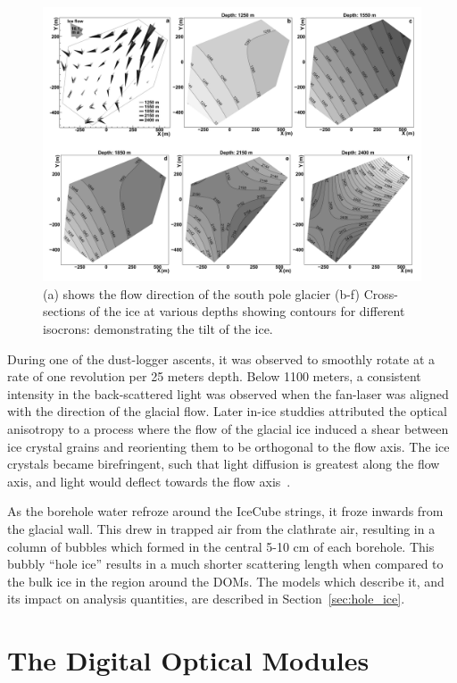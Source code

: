 \documentclass[main.tex]{subfiles}
\begin{document}
\begin{figure}  
    \centering
    \includegraphics[width=0.8\linewidth]{figures/icecube_isochron.png}
    \caption{(a) shows the flow direction of the south pole glacier (b-f) Cross-sections of the ice at various depths showing contours for different isocrons: demonstrating the tilt of the ice.}\label{fig:isochron}
\end{figure}

During one of the dust-logger ascents, it was observed to smoothly rotate at a rate of one revolution per 25 meters depth. 
Below 1100 meters, a consistent intensity in the back-scattered light was observed when the fan-laser was aligned with the direction of the glacial flow. 
Later in-ice studdies attributed the optical anisotropy to a process where the flow of the glacial ice induced a shear between ice crystal grains and reorienting them to be orthogonal to the flow axis. 
The ice crystals became birefringent, such that light diffusion is greatest along the flow axis, and light would deflect towards the flow axis~\cite{ice_anisotropy, ice_birefringence}.

As the borehole water refroze around the IceCube strings, it froze inwards from the glacial wall. 
This drew in trapped air from the clathrate air, resulting in a column of bubbles which formed in the central 5-10 cm of each borehole.
This bubbly ``hole ice'' results in a much shorter scattering length when compared to the bulk ice in the region around the DOMs. 
The models which describe it, and its impact on analysis quantities, are described in Section~\ref{sec:hole_ice}. 

\section{The Digital Optical Modules}
\end{document}
